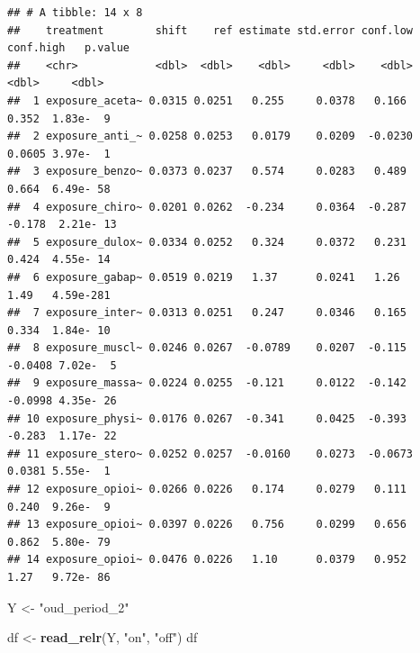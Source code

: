 \documentclass[
]{article}
\newenvironment{Shaded}{\begin{snugshade}}{\end{snugshade}}
\newcommand{\FunctionTok}[1]{\textcolor[rgb]{0.13,0.29,0.53}{\textbf{#1}}}
\newcommand{\NormalTok}[1]{#1}
\newcommand{\OtherTok}[1]{\textcolor[rgb]{0.56,0.35,0.01}{#1}}
\newcommand{\StringTok}[1]{\textcolor[rgb]{0.31,0.60,0.02}{#1}}
\begin{document}
\begin{verbatim}
## # A tibble: 14 x 8
##    treatment        shift    ref estimate std.error conf.low conf.high   p.value
##    <chr>            <dbl>  <dbl>    <dbl>     <dbl>    <dbl>     <dbl>     <dbl>
##  1 exposure_aceta~ 0.0315 0.0251   0.255     0.0378   0.166     0.352  1.83e-  9
##  2 exposure_anti_~ 0.0258 0.0253   0.0179    0.0209  -0.0230    0.0605 3.97e-  1
##  3 exposure_benzo~ 0.0373 0.0237   0.574     0.0283   0.489     0.664  6.49e- 58
##  4 exposure_chiro~ 0.0201 0.0262  -0.234     0.0364  -0.287    -0.178  2.21e- 13
##  5 exposure_dulox~ 0.0334 0.0252   0.324     0.0372   0.231     0.424  4.55e- 14
##  6 exposure_gabap~ 0.0519 0.0219   1.37      0.0241   1.26      1.49   4.59e-281
##  7 exposure_inter~ 0.0313 0.0251   0.247     0.0346   0.165     0.334  1.84e- 10
##  8 exposure_muscl~ 0.0246 0.0267  -0.0789    0.0207  -0.115    -0.0408 7.02e-  5
##  9 exposure_massa~ 0.0224 0.0255  -0.121     0.0122  -0.142    -0.0998 4.35e- 26
## 10 exposure_physi~ 0.0176 0.0267  -0.341     0.0425  -0.393    -0.283  1.17e- 22
## 11 exposure_stero~ 0.0252 0.0257  -0.0160    0.0273  -0.0673    0.0381 5.55e-  1
## 12 exposure_opioi~ 0.0266 0.0226   0.174     0.0279   0.111     0.240  9.26e-  9
## 13 exposure_opioi~ 0.0397 0.0226   0.756     0.0299   0.656     0.862  5.80e- 79
## 14 exposure_opioi~ 0.0476 0.0226   1.10      0.0379   0.952     1.27   9.72e- 86
\end{verbatim}

\begin{Shaded}
\begin{Highlighting}[]
\NormalTok{Y }\OtherTok{\textless{}{-}} \StringTok{"oud\_period\_2"}

\NormalTok{df }\OtherTok{\textless{}{-}} \FunctionTok{read\_relr}\NormalTok{(Y, }\StringTok{"on"}\NormalTok{, }\StringTok{"off"}\NormalTok{)}
\NormalTok{df}
\end{Highlighting}
\end{Shaded}
\end{document}

